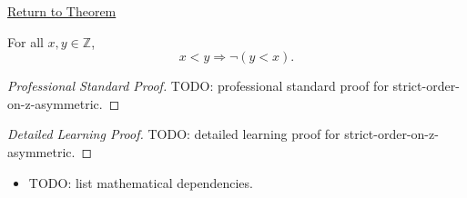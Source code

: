 \newpage
{}
\label{prf:strict-order-on-z-asymmetric}

\begin{remark*}[Return]
\hyperref[thm:strict-order-on-z-asymmetric]{Return to Theorem}
\end{remark*}

\begin{theorem*}
For all $x,y\in\mathbb{Z}$,
\[
x<y \Longrightarrow \neg(y<x).
\]
\end{theorem*}

\begin{proof}[Professional Standard Proof]
\LRAProofBodyStart
TODO: professional standard proof for strict-order-on-z-asymmetric.
\end{proof}

\begin{proof}[Detailed Learning Proof]
\LRAProofBodyStart
TODO: detailed learning proof for strict-order-on-z-asymmetric.
\end{proof}

\begin{remark*}
\end{remark*}

\begin{dependencies}
\begin{itemize}
  \item TODO: list mathematical dependencies.
\end{itemize}
\end{dependencies}

\clearpage
